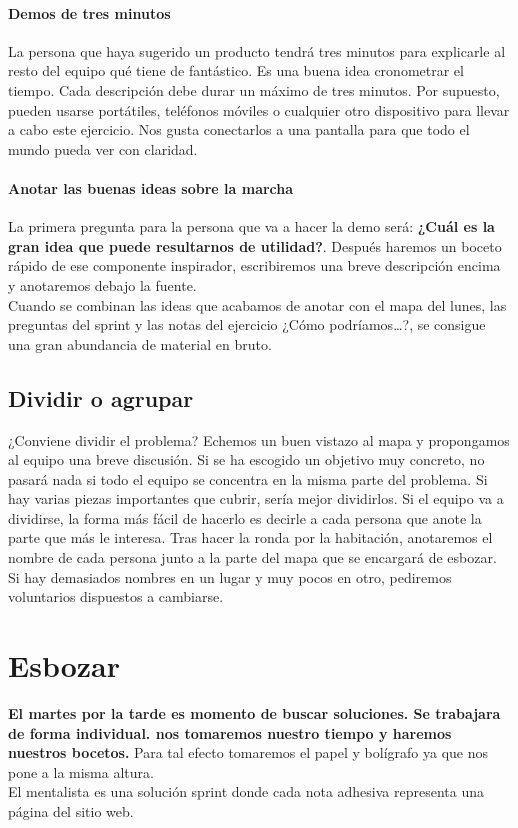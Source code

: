 \documentclass[10pt]{article}
\begin{document}
\begin{multicols}{2}
\paragraph*{Demos de tres minutos} 
La persona que haya sugerido un producto tendrá tres minutos para explicarle al resto del equipo qué tiene de fantástico. Es una buena idea cronometrar el tiempo. Cada descripción debe durar un máximo de tres minutos. Por supuesto, pueden usarse portátiles, teléfonos móviles o cualquier otro dispositivo para llevar a cabo este ejercicio. Nos gusta conectarlos a una pantalla para que todo el mundo pueda ver con claridad.
\paragraph*{Anotar las buenas ideas sobre la marcha}
La primera pregunta para la persona que va a hacer la demo será: \textbf{¿Cuál es la gran idea que puede resultarnos de utilidad?}. Después haremos un boceto rápido de ese componente inspirador, escribiremos una breve descripción encima y anotaremos debajo la fuente.\\
Cuando se combinan las ideas que acabamos de anotar con el mapa del lunes, las preguntas del sprint y las notas del ejercicio ¿Cómo podríamos…?, se consigue una gran abundancia de material en bruto.\\
\subsection*{Dividir o agrupar}
¿Conviene dividir el problema? Echemos un buen vistazo al mapa y
propongamos al equipo una breve discusión. Si se ha escogido un objetivo muy concreto, no pasará nada si todo el equipo se concentra en la misma parte del problema. Si hay varias piezas importantes que cubrir, sería mejor dividirlos. Si el equipo va a dividirse, la forma más fácil de hacerlo es decirle a cada persona que anote la parte que más le interesa. Tras hacer la ronda por la habitación, anotaremos el nombre de cada persona junto a la parte del mapa que se encargará de esbozar. Si hay demasiados nombres en un lugar y muy pocos en otro, pediremos voluntarios dispuestos a cambiarse.
\section*{Esbozar}
\textbf{El martes por la tarde es momento de buscar soluciones. Se trabajara de forma individual. nos tomaremos nuestro tiempo y haremos nuestros bocetos.} Para tal efecto tomaremos el papel y bolígrafo ya que nos pone a la misma altura.\\
El mentalista es una solución sprint donde cada nota adhesiva representa una página del sitio web.\\

\end{multicols}
\end{document}
